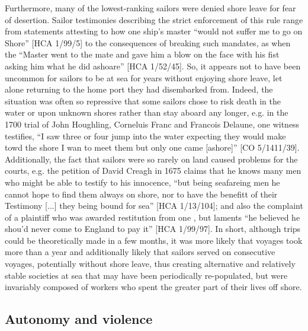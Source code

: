 Furthermore, many of the lowest-ranking sailors were denied shore leave for fear of desertion. Sailor testimonies describing the strict enforcement of this rule range from statements attesting to how one ship’s master “would not suffer me to go on Shore” [HCA 1/99/5] to the consequences of breaking such mandates, as when the “Master went to the mate and gave him a blow on the face with his fist asking him what he did ashoare” [HCA 1/52/45]. So, it appears not to have been uncommon for sailors to be at sea for years without enjoying shore leave, let alone returning to the home port they had disembarked from. Indeed, the situation was often so repressive that some sailors chose to risk death in the water or upon unknown shores rather than stay aboard any longer, e.g. in the 1700 trial of John Houghling, Corneluis Franc and Francois Delaune, one witness testifies, “I saw three or four jump into the water expecting they would make towd the shore I wan to meet them but only one came [ashore]” [CO 5/1411/39]. Additionally, the fact that sailors were so rarely on land caused problems for the courts, e.g. the petition of David Creagh in 1675 claims that he knows many men who might be able to testify to his innocence, “but being seafareing men he cannot hope to find them always on shore, nor to have the benefitt of their Testimony [...] they being bound for sea” [HCA 1/13/104]; and also the complaint of a plaintiff who was awarded restitution from one , but laments “he believed he shou’d never come to England to pay it”  [HCA 1/99/97]. In short, although  trips could be theoretically made in a few months, it was more likely that voyages took more than a year and additionally likely that sailors served on consecutive voyages, potentially without shore leave, thus creating alternative and relatively stable societies at sea that may have been periodically re-populated, but were invariably composed of workers who spent the greater part of their lives off shore. 

\subsection{{Autonomy and violence}}\label{sec:4.2.2}

